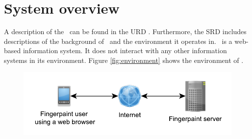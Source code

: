 \chapter{System overview}
\label{chap:systoverview}
A description of the \applicationname\ can be found in the URD \cite{urd}. Furthermore, the SRD \cite{srd} includes descriptions of the background of \projectname\ and the environment it operates in.
\projectname\ is a web-based information system. It does not interact with any other information systems in its environment. Figure \ref{fig:environment} shows the environment of \projectname.

\begin{figure}[h!]
\begin{center}
\includegraphics[keepaspectratio=true,width=\textwidth]{Environment.pdf}
\end{center}
\end{figure}
